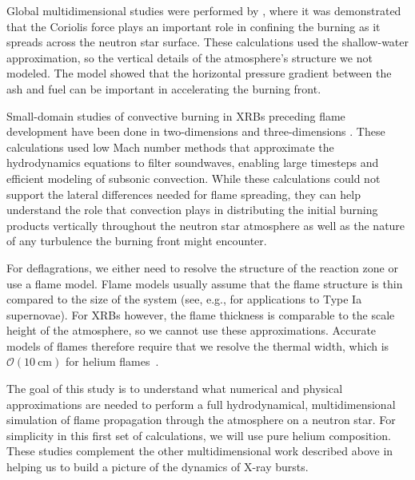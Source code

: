 \documentclass[preprint,times,tighten]{aastex63}
\newcommand{\MarginPar}[1]{
    \marginpar{\vskip-\baselineskip%
               \raggedright%
               \tiny\sffamily%
               {\color{red}\hrule%
               \smallskip%
               #1\par%
               \smallskip%
               \hrule}}%
}
\begin{document}
Global multidimensional studies were performed by
\citet{spitkovsky2002}, where it was demonstrated that the Coriolis
force plays an important role in confining the burning as it spreads
across the neutron star surface.  These calculations used the
shallow-water approximation, so the vertical details of the
atmosphere's structure we not modeled.  The model showed that the
horizontal pressure gradient between the ash and fuel can be important
in accelerating the burning front.

Small-domain studies of convective burning in XRBs preceding flame
development have been done in two-dimensions \citep{lin:2006,xrb,xrb2}
and three-dimensions \citep{xrb3d}.  These calculations used low Mach
number methods that approximate the hydrodynamics equations to filter
soundwaves, enabling large timesteps and efficient modeling of
subsonic convection.  While these calculations could not support
the lateral differences needed for flame spreading, they can help
understand the role that convection plays in distributing the initial
burning products vertically throughout the neutron star atmosphere as well
as the nature of any turbulence the burning front might encounter.



\cite{cavecchi:2013,art-2015-cavecchi-etal,art-2016-cavecchi-etal} \MarginPar{need a summary}

For deflagrations, we either need to resolve the structure of the
reaction zone or use a flame model.  Flame models usually assume that
the flame structure is thin compared to the size of the system (see,
e.g., \citet{Ropke2007} for applications to Type Ia supernovae).  For
XRBs however, the flame thickness is comparable to the scale height of
the atmosphere, so we cannot use these approximations.  Accurate
models of flames therefore require that we resolve the thermal width,
which is $\mathcal{O}(10~\mbox{cm})$ for helium flames~\citep{Timmes00}.

The goal of this study is to understand what numerical and physical
approximations are needed to perform a full hydrodynamical,
multidimensional simulation of flame propagation through the
atmosphere on a neutron star.  For simplicity in this first set of
calculations, we will use pure helium composition.  These studies
complement the other multidimensional work described above in helping
us to build a picture of the dynamics of X-ray bursts.


\end{document}
